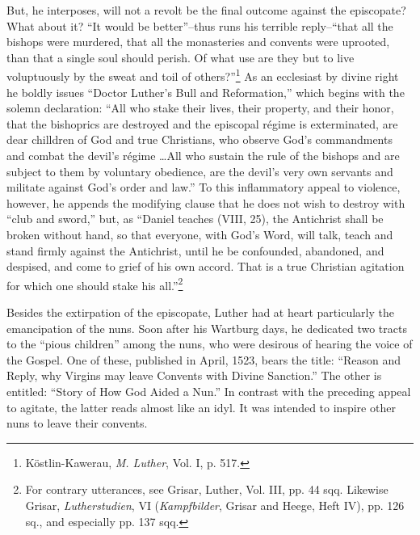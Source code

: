 But, he interposes, will not a revolt be the final outcome
against the episcopate? What about it? “It would be better”--thus runs his
terrible reply--“that all the bishops were murdered, that all the monasteries
and convents were uprooted, than that a single soul should perish. Of what
use are they but to live voluptuously by the sweat and toil of others?”\footnote
{Köstlin-Kawerau, \textit{M. Luther}, Vol. I, p. 517.}
As an ecclesiast by divine right he boldly issues “Doctor Luther’s Bull and
Reformation,” which begins with the solemn declaration: “All who stake
their lives, their property, and their honor, that the bishoprics are destroyed
and the episcopal régime is exterminated, are dear chilldren of God and
true Christians, who observe God’s commandments and combat the devil’s
régime \dots All who sustain the rule of the bishops and are subject to
them by voluntary obedience, are the devil’s very own servants and militate
against God’s order and law.” To this inflammatory appeal to violence,
however, he appends the modifying clause that he does not wish to destroy
with “club and sword,” but, as “Daniel teaches (VIII, 25), the Antichrist
shall be broken without hand, so that everyone, with God’s Word, will talk,
teach and stand firmly against the Antichrist, until he be confounded,
abandoned, and despised, and come to grief of his own accord. That is a true
Christian agitation for which one should stake his all.”\footnote
{For contrary utterances, see Grisar, Luther, Vol. III, pp. 44 sqq. Likewise Grisar,
\textit{Lutherstudien}, VI (\textit{Kampfbilder}, Grisar and Heege, Heft IV), pp. 126 sq., and especially
pp. 137 sqq.}

Besides the extirpation of the episcopate, Luther had at heart
particularly the emancipation of the nuns. Soon after his Wartburg
days, he dedicated two tracts to the “pious children” among the
nuns, who were desirous of hearing the voice of the Gospel. One of
these, published in April, 1523, bears the title: “Reason and Reply,
why Virgins may leave Convents with Divine Sanction.” The other
is entitled: “Story of How God Aided a Nun.” In contrast with the
preceding appeal to agitate, the latter reads almost like an idyl. It
was intended to inspire other nuns to leave their convents.

